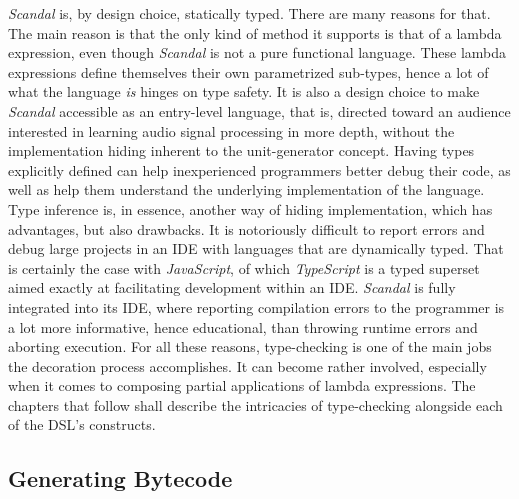 \emph{Scandal} is, by design choice, statically typed. There are many reasons for that. The main reason is that the only kind of method it supports is that of a lambda expression, even though \emph{Scandal} is not a pure functional language. These lambda expressions define themselves their own parametrized sub-types, hence a lot of what the language \emph{is} hinges on type safety. It is also a design choice to make \emph{Scandal} accessible as an entry-level language, that is, directed toward an audience interested in learning audio signal processing in more depth, without the implementation hiding inherent to the unit-generator concept. Having types explicitly defined can help inexperienced programmers better debug their code, as well as help them understand the underlying implementation of the language. Type inference is, in essence, another way of hiding implementation, which has advantages, but also drawbacks. It is notoriously difficult to report errors and debug large projects in an IDE with languages that are dynamically typed. That is certainly the case with \emph{JavaScript}, of which \emph{TypeScript} is a typed superset aimed exactly at facilitating development within an IDE. \emph{Scandal} is fully integrated into its IDE, where reporting compilation errors to the programmer is a lot more informative, hence educational, than throwing runtime errors and aborting execution. For all these reasons, type-checking is one of the main jobs the decoration process accomplishes. It can become rather involved, especially when it comes to composing partial applications of lambda expressions. The chapters that follow shall describe the intricacies of type-checking alongside each of the DSL's constructs.

\subsection{Generating Bytecode}

